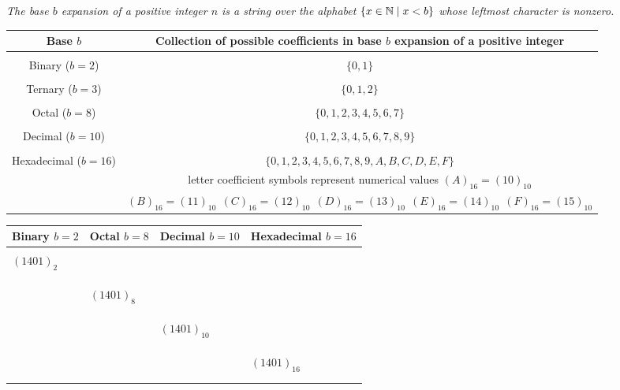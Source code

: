 \documentclass[12pt, oneside]{article}
\begin{document}
{\it The base $b$ expansion of a positive integer $n$ is a string over the alphabet $\{x \in \mathbb{N} \mid x < b\}$
whose leftmost character is nonzero.}

\begin{center}
\begin{tabular}{|c|c|}
\hline
Base $b$ & Collection of possible coefficients in base $b$ expansion of  a positive integer \\
\hline
& \\
Binary ($b=2$) & $\{0,1\}$ \\
\hline
& \\
Ternary ($b=3$) & $\{0,1, 2\}$ \\
\hline
& \\
Octal ($b=8$) & $\{0,1, 2, 3, 4, 5, 6, 7\}$\\
\hline
& \\
Decimal ($b=10$) & $\{0,1, 2, 3, 4, 5, 6, 7, 8, 9\}$\\
\hline
& \\
Hexadecimal ($b=16$) &  $\{0,1, 2, 3, 4, 5, 6, 7, 8, 9, A, B, C, D, E, F\}$\\
& letter coefficient symbols represent numerical values $(A)_{16} = (10)_{10}$\\
&$(B)_{16} = (11)_{10} ~~(C)_{16} = (12)_{10} ~~
 (D)_{16} = (13)_{10} ~~ (E)_{16} = (14)_{10} ~~ (F)_{16} = (15)_{10} $\\
\hline
\end{tabular}
\end{center}



\begin{center}
\begin{tabular}{|p{1.75in}|p{1.75in}|p{1.75in}|p{1.75in}|}
\hline
Binary  $b=2$ & Octal $b=8$ & Decimal $b=10$ & Hexadecimal $b=16$ \\
\hline 
&&&  \\
$(1401)_{2}$&&&\\
&&&  \\
&&&  \\
\hline 
&&&  \\
& $(1401)_{8}$&&\\
&&&\\
&&&  \\
\hline
&&&\\
&&$(1401)_{10}$&\\
&&&  \\
&&&\\
\hline
&&&\\
&&& $(1401)_{16}$\\
&&&  \\
&&&\\
\hline
\end{tabular}
\end{center}
\end{document}
